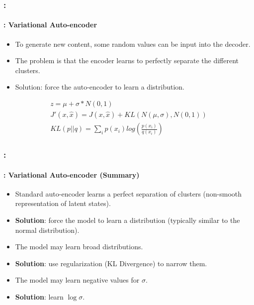 \documentclass[xcolor=table]{beamer}
\begin{document}
\begin{frame}
	\frametitle{\insertshortsubtitle: \insertsection}
	\framesubtitle{\insertsubsection: Variational Auto-encoder}
	
	\begin{itemize}
		\item To generate new content, some random values can be input into the decoder.
		\item The problem is that the encoder learns to perfectly separate the different clusters.
		\item Solution: force the auto-encoder to learn a distribution.
	\end{itemize}

	\begin{minipage}{0.60\textwidth} 
		\begin{align*}
			z = \mu + \sigma * N(0, 1) \\
			J'(x, \hat{x}) = J(x, \hat{x}) + KL(N(\mu, \sigma), N(0, 1)) \\
			KL(p||q) = \sum_i p(x_i) log(\frac{p(x_i)}{q(x_i)})
		\end{align*}
	\end{minipage}
	\begin{minipage}{0.39\textwidth}
	\end{minipage}

\end{frame}

\begin{frame}
	\frametitle{\insertshortsubtitle: \insertsection}
	\framesubtitle{\insertsubsection: Variational Auto-encoder (Summary)}
	
	\begin{itemize}
		\item Standard auto-encoder learns a perfect separation of clusters (non-smooth representation of latent states).
		\item \textbf{Solution}: force the model to learn a distribution (typically similar to the normal distribution).
		\item The model may learn broad distributions.
		\item \textbf{Solution}: use regularization (KL Divergence) to narrow them.
		\item The model may learn negative values for $\sigma$.
		\item \textbf{Solution}: learn $\log \sigma$.
	\end{itemize}

\end{frame}
\end{document}
